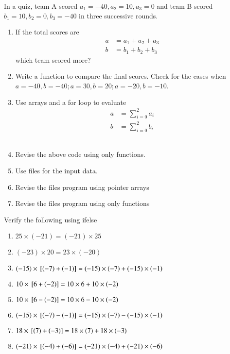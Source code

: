 In a quiz, team A scored $a_1 = -40, a_2=10, a_3=0$ and team B scored $b_1=10, b_2=0, b_3=-40$ in three successive rounds.
\begin{enumerate}[label=\thesection.\arabic*, ref=\thesubsection.\theenumi]
\item  If the total scores are 
	\begin{align}
		a &= a_1+a_2+a_3
		\\
		b &= b_1+b_2+b_3
	\end{align}
	which team scored more? 
	\\
	\solution 
	
\item Write a function to compare the final scores.  Check for the cases when $a = -40, b = -40; a = 30, b = 20; a = -20, b = -10$.
	\\
	\solution 
	
\item Use arrays and a for loop to evaluate 
	\begin{align}
		a &= \sum_{i=0}^{2}a_i
		\\
		b &= \sum_{i=0}^{2}b_i
	\end{align}
	\\
	\solution 
	
\item Revise the above code using only functions.
	\\
	\solution 
	
\item Use files for the input data.
	\\
	\solution 
	
\item Revise the files program using pointer arrays
	\\
	\solution 
	
\item Revise the files program using only functions
	\\
	\solution 
	
\end{enumerate}
Verify the following using ifelse 
\begin{enumerate}[label=\thesection.\arabic*, ref=\thesubsection.\theenumi,resume*]
	\item $25 \times (-21) = (-21)\times 25 $
	\item $(-23)\times  20 = 23 \times (-20)$
	\item $(-15)\times  {}\left[\left(-7\right)+\left(-1\right)\right] =(-15)\times\left(-7\right)+(-15) \times \left(-1\right) $
	\item $10\times  {}\left[6+\left(-2\right)\right] =10\times 6+10 \times \left(-2\right) $
	\item $10\times  {}\left[6-\left(-2\right)\right] =10\times 6-10 \times \left(-2\right) $
	\item $(-15)\times  {}\left[\left(-7\right)-\left(-1\right)\right] =(-15)\times\left(-7\right)-(-15) \times \left(-1\right) $
	\item $18\times  {}\left[\left(7\right)+\left(-3\right)\right] =18\times\left(7\right)+18 \times \left(-3\right) $
	\item $(-21)\times  {}\left[\left(-4\right)+\left(-6\right)\right] =(-21)\times\left(-4\right)+(-21) \times \left(-6\right) $
\end{enumerate}
